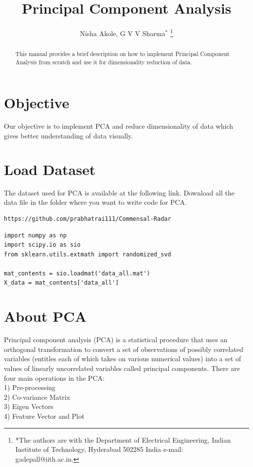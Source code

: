 \documentclass[journal,12pt,twocolumn]{IEEEtran}
\begin{document}
 \title{ Principal Component Analysis}
 
 \author{Nisha Akole, G V V 
Sharma$^{*}$%
\thanks{*The authors are with the Department
of Electrical Engineering, Indian Institute of Technology, Hyderabad
502285 India e-mail:  gadepall@iith.ac.in.}
}
\maketitle

\tableofcontents

\bigskip

\begin{abstract}
This manual provides a brief description on how to implement Principal Component Analysis from scratch and use it for dimensionality reduction of data.
\end{abstract}

\IEEEpeerreviewmaketitle

\section{Objective}
Our objective is to implement PCA and reduce dimensionality of data which gives better understanding of data visually.

\section{Load Dataset}
The dataset used for PCA is available at the following link. Download all the data file in the folder where you want to write code for PCA.
\begin{lstlisting}
https://github.com/prabhatrai111/Commensal-Radar
\end{lstlisting}
\begin{lstlisting}
import numpy as np
import scipy.io as sio
from sklearn.utils.extmath import randomized_svd

mat_contents = sio.loadmat('data_all.mat')
X_data = mat_contents['data_all']
\end{lstlisting}

\section{About PCA}
Principal component analysis (PCA) is a statistical procedure that uses an orthogonal transformation to convert a set of observations of possibly correlated variables (entitles each of which takes on various numerical values) into a set of values of linearly uncorrelated variables called principal components.
There are four main operations in the PCA:\\
		1) Pre-processing\\
		2) Co-variance Matrix\\
		3) Eigen Vectors\\
		4) Feature Vector and Plot
\end{document}
